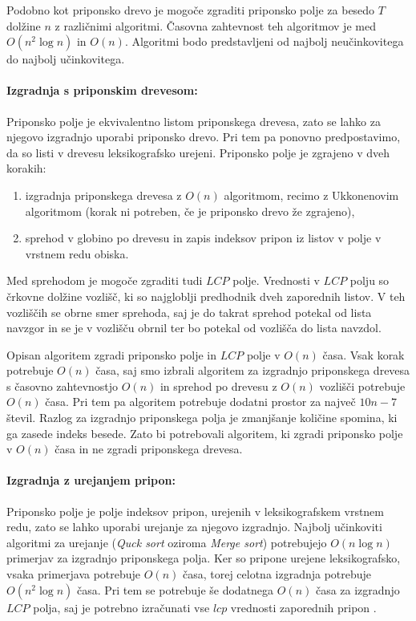 Podobno kot priponsko drevo je mogoče zgraditi priponsko polje za besedo $T$ dolžine $n$ z različnimi algoritmi. Časovna zahtevnost teh algoritmov je med $O(n^2\log{n})$ in $O(n)$. Algoritmi bodo predstavljeni od najbolj neučinkovitega do najbolj učinkovitega.

\paragraph{Izgradnja s priponskim drevesom:}
Priponsko polje je ekvivalentno listom priponskega drevesa, zato se lahko za njegovo izgradnjo uporabi priponsko drevo. Pri tem pa ponovno predpostavimo, da so listi v drevesu leksikografsko urejeni. Priponsko polje je zgrajeno v dveh korakih:

\begin{enumerate}
    \item izgradnja priponskega drevesa z $O(n)$ algoritmom, recimo z Ukkonenovim algoritmom (korak ni potreben, če je priponsko drevo že zgrajeno),
    \item sprehod v globino po drevesu in zapis indeksov pripon iz listov v polje v vrstnem redu obiska. %
\end{enumerate}
Med sprehodom je mogoče zgraditi tudi $LCP$ polje. Vrednosti v $LCP$ polju so črkovne dolžine vozlišč, ki so najgloblji predhodnik dveh zaporednih listov. V teh vozliščih se obrne smer sprehoda, saj je do takrat sprehod potekal od lista navzgor in se je v vozlišču obrnil ter bo potekal od vozlišča do lista navzdol.

Opisan algoritem zgradi priponsko polje in $LCP$ polje v $O(n)$ časa. Vsak korak potrebuje $O(n)$ časa, saj smo izbrali algoritem za izgradnjo priponskega drevesa s časovno zahtevnostjo $O(n)$ in sprehod po drevesu z $O(n)$ vozlišči potrebuje $O(n)$ časa. Pri tem pa algoritem potrebuje dodatni prostor za največ $10n-7$ števil. Razlog za izgradnjo priponskega polja je zmanjšanje količine spomina, ki ga zasede indeks besede. Zato bi potrebovali algoritem, ki zgradi priponsko polje v $O(n)$ časa in ne zgradi priponskega drevesa.

\paragraph{Izgradnja z urejanjem pripon:}
Priponsko polje je polje indeksov pripon, urejenih v leksikografskem vrstnem redu, zato se lahko uporabi urejanje za njegovo izgradnjo. Najbolj učinkoviti algoritmi za urejanje (\textit{Quck sort} oziroma \textit{Merge sort}) potrebujejo $O(n\log{n})$ primerjav za izgradnjo priponskega polja. Ker so pripone urejene leksikografsko, vsaka primerjava potrebuje $O(n)$ časa, torej celotna izgradnja potrebuje $O(n^2\log{n})$ časa. Pri tem se potrebuje še dodatnega $O(n)$ časa za izgradnjo $LCP$ polja, saj je potrebno izračunati vse $lcp$ vrednosti zaporednih pripon \cite{Kasai2001}.


